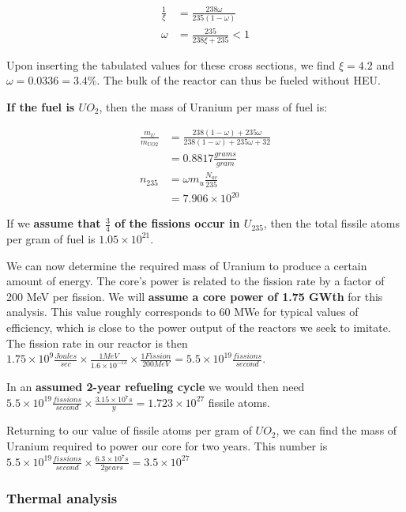 \documentclass[12pt]{article}
\begin{document}
\begin{align}
\frac{1}{\xi} &= \frac{238 \omega}{235 (1 - \omega)} \\
\omega &= \frac{235}{238 \xi + 235} < 1
\end{align} 

Upon inserting the tabulated values for these cross sections, we find $\xi = 4.2$ and $\omega = 0.0336 = 3.4 \% $. The bulk of the reactor can thus be fueled without HEU.

\textbf{If the fuel is $UO_2$}, then the mass of Uranium per mass of fuel is:

\begin{align}
\frac{m_U}{m_{UO2}} &= \frac{238 (1 - \omega) + 235 \omega}{238 (1 - \omega) + 235 \omega + 32} \\
 &= 0.8817 \frac{grams}{gram} \\
n_{235} &= \omega m_u \frac{N_{av}}{235} \\
 &= 7.906 \times 10^{20}
\end{align}

If we \textbf{assume that $\frac{3}{4}$ of the fissions occur in $U_{235}$}, then the total fissile atoms per gram of fuel is $1.05 \times 10^{21}$. 

We can now determine the required mass of Uranium to produce a certain amount of energy. The core's power is related to the fission rate by a factor of 200 MeV per fission. We will \textbf{assume a core power of 1.75 GWth} for this analysis. This value roughly corresponds to 60 MWe for typical values of efficiency, which is close to the power output of the reactors we seek to imitate. The fission rate in our reactor is then $1.75 \times 10^9 \frac{Joules}{sec} \times \frac{1 MeV}{1.6 \times 10^{-13}} \times \frac{1 Fission}{200 MeV} = 5.5 \times 10^{19} \frac{fissions}{second}$.

In an \textbf{assumed 2-year refueling cycle} we would then need $5.5 \times 10^{19} \frac{fissions}{second} \times \frac{3.15 \times 10^7 s}{y} = 1.723 \times 10^{27}$ fissile atoms. 

Returning to our value of fissile atoms per gram of $UO_2$, we can find the mass of Uranium required to power our core for two years. This number is $5.5 \times 10^{19} \frac{fissions}{second} \times \frac{6.3 \times 10^7 s}{2 years} = 3.5 \times 10^{27}$

\subsubsection{Thermal analysis}
\end{document}
